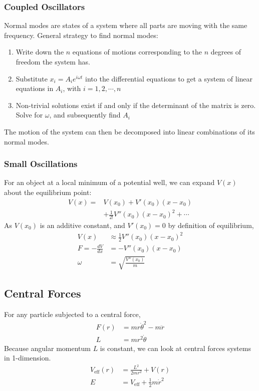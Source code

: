 \documentclass[11pt]{article}
\begin{document}
\begin{multicols*}{3}
\subsubsection*{Coupled Oscillators}
Normal modes are states of a system where all parts are moving with the same frequency. General strategy to find normal modes:
\begin{enumerate}
\item Write down the $n$ equations of motions corresponding to the $n$ degrees of freedom the system has.
\item Substitute $x_i=A_ie^{i\omega t}$ into the differential equations to get a system of linear equations in $A_i$, with $i=1,2,\cdots,n$
\item Non-trivial solutions exist if and only if the determinant of the matrix is zero. Solve for $\omega$, and subsequently find $A_i$
\end{enumerate}
The motion of the system can then be decomposed into linear combinations of its normal modes.
\subsubsection*{Small Oscillations}
For an object at a local minimum of a potential well, we can expand $V(x)$ about the equilibrium point:
	\begin{align*}
	V(x)=&V(x_0)+V'(x_0)(x-x_0)\\
	&+ \frac{1}{2!}V''(x_0)(x-x_0)^2+\cdots
	\end{align*}
As $V(x_0)$ is an additive constant, and $V'(x_0)=0$ by definition of equilibrium, 
	\begin{align*}
	V(x) &\approx \frac{1}{2}V''(x_0)(x-x_0)^2 \\
	F = -\frac{dV}{dx}&=-V''(x_0)(x-x_0) \\
	\omega&=\sqrt{\frac{V''(x_0)}{m}}
	\end{align*}
\subsection{Central Forces}
For any particle subjected to a central force,
	\begin{align*}
	F(r) &= m r \dot{\theta}^2 - m \ddot{r} \\
	L &= mr^2\dot{\theta}
	\end{align*}
Because angular momentum $L$ is constant, we can look at central forces systems in 1-dimension.
	\begin{align*}
	V_{\text{eff}}(r) &= \frac{L^2}{2mr^2} + V(r) \\
	E &= V_{\text{eff}} + \frac{1}{2} m \dot{r}^2
	\end{align*}

\end{multicols*}
\end{document}
